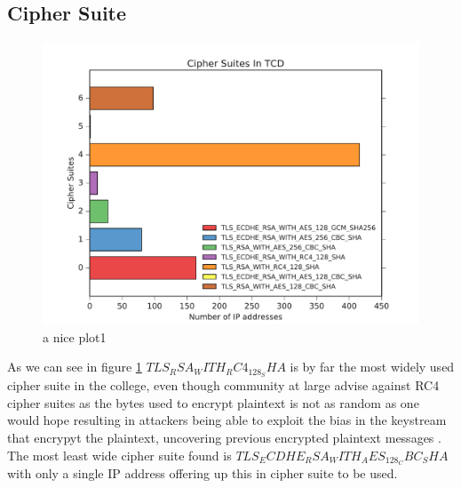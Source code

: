 \documentclass[a4wide,leqno,12pt]{report}
\begin{document}
\subsection{Cipher Suite}
\begin{figure}[H]
\centering
\includegraphics[scale=.5]{pdf_images/CipherSuitesInTCD}
\caption{a nice plot1}
\label{fig:cipherSuites}
\end{figure}

As we can see in figure \ref{fig:cipherSuites} $TLS_RSA_WITH_RC4_128_SHA$ is by far the most widely used cipher suite in the college, even though community at large advise against RC4 cipher suites as the bytes used to encrypt plaintext is not as random as one would hope resulting in attackers being able to exploit the bias in the keystream that encrypyt the plaintext, uncovering previous encrypted plaintext messages \cite{popov2015prohibiting}. The most least wide cipher suite found is  $TLS_ECDHE_RSA_WITH_AES_128_CBC_SHA$ with only a single IP address offering up this in cipher suite to be used.
\end{document}
